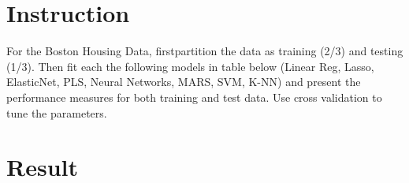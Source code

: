 \documentclass[12pt]{article}
\begin{document}

\maketitle


\section{Instruction}
For the Boston Housing Data, firstpartition the data as training (2/3) and testing (1/3).
Then fit each the following models in table below (Linear Reg, Lasso, ElasticNet, PLS, Neural Networks, MARS, SVM, K-NN) and present the performance
measures for both training and test data. Use cross validation to tune the parameters. 

\newpage

\section{Result}
\end{document}
